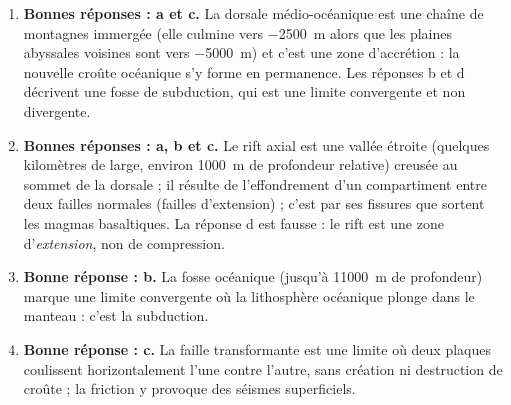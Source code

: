 \documentclass[11pt]{article}
\newcommand{\cle}[1]{{\popxbold\color{popdark}#1}}
\begin{document}
\begin{corrige}
\begin{enumerate}
\item \textbf{Bonnes réponses : a et c.} La dorsale médio-océanique est une chaîne de montagnes immergée (elle culmine vers \SI{-2500}{m} alors que les plaines abyssales voisines sont vers \SI{-5000}{m}) et c'est une \cle{zone d'accrétion} : la nouvelle croûte océanique s'y forme en permanence. Les réponses b et d décrivent une fosse de subduction, qui est une limite convergente et non divergente.
\item \textbf{Bonnes réponses : a, b et c.} Le rift axial est une vallée étroite (quelques kilomètres de large, environ \SI{1000}{m} de profondeur relative) creusée au sommet de la dorsale ; il résulte de l'\cle{effondrement} d'un compartiment entre deux \cle{failles normales} (failles d'extension) ; c'est par ses fissures que sortent les magmas basaltiques. La réponse d est fausse : le rift est une zone d'\emph{extension}, non de compression.
\item \textbf{Bonne réponse : b.} La fosse océanique (jusqu'à \SI{11000}{m} de profondeur) marque une limite \cle{convergente} où la lithosphère océanique plonge dans le manteau : c'est la \cle{subduction}.
\item \textbf{Bonne réponse : c.} La faille transformante est une limite où deux plaques \cle{coulissent horizontalement} l'une contre l'autre, sans création ni destruction de croûte ; la friction y provoque des séismes superficiels.
\end{enumerate}
\end{corrige}
\end{document}
